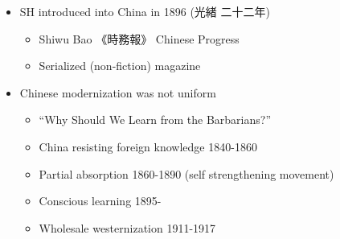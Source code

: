 \documentclass[a4paper,landscape,headrule,footrule,xetex]{foils}
\begin{document}
\renewcommand{\avmvalfont}{\it}
\maketitle






\begin{itemize}
\item SH introduced into China in 1896 (光緒 二十二年)
  \begin{itemize}
  \item Shiwu Bao 《時務報》 Chinese Progress
  \item Serialized (non-fiction) magazine
  \end{itemize}
\item Chinese modernization was not uniform
  \begin{itemize}
  \item “Why Should We Learn from the Barbarians?”
  \item China resisting foreign knowledge 1840-1860
  \item  Partial absorption 1860-1890 (self strengthening movement)
  \item  Conscious learning 1895-
  \item  Wholesale westernization 1911-1917
  \end{itemize}
\end{itemize}
\end{document}
